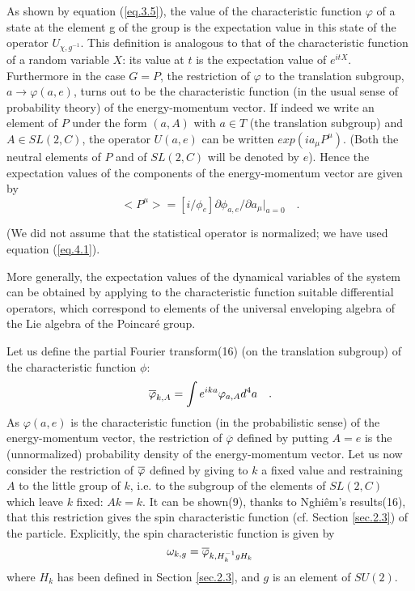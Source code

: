\documentclass[a4paper,11pt]{article}
\def\Uc#1{U_{\chi,{#1}}}
\begin{document}
 As shown by equation (\ref{eq.3.5}), the value of the characteristic function $\varphi$ of a 
state at 
the element g of the group is the expectation value in this state of the operator 
$\Uc{g^{-1}}$. This 
definition is analogous to that of the characteristic function of a random variable $X$: its 
value at $t$ is the expectation value of $e^{itX}$. Furthermore in the case $G=P$, the 
restriction of $\varphi$ 
to the translation subgroup, $a \rightarrow \varphi(a,e)$, turns out to be the characteristic 
function (in the 
usual sense of probability theory) of the energy-momentum vector. If indeed we write an element 
of $P$ under the form $(a,A)$ with $a \in T$ (the translation subgroup) and $A \in  SL(2,C)$, 
the operator 
$U(a,e)$ can be written $exp(ia_{\mu}P^{\mu})$. (Both the neutral elements of $P$ and of 
$SL(2,C)$ will be 
denoted by $e$). Hence the expectation values of the components of the energy-momentum vector 
are given by  
\begin{equation}
 \label{eq.5.1}
    < P^{\mu} > = [i/\phi_e] \partial \phi_{a,e}/\partial a_{\mu} |_{a=0}  \quad .
\end{equation}

(We did not assume that the statistical operator is normalized; we have used equation 
(\ref{eq.4.1}). 

More generally, the expectation values of the dynamical variables of the system can be obtained 
by applying to the characteristic function suitable differential operators, which correspond to 
elements of the universal enveloping algebra of the Lie algebra of the Poincar\'e  group. 

Let us define the partial Fourier transform(16) (on the translation subgroup) of the 
characteristic function $\phi$:
$$
  \overline{\varphi}_{k,A} = \int e^{ika} \varphi_{a,A} d^4a  \quad .
$$
As $\varphi(a,e)$ is the characteristic function (in the probabilistic sense) of the 
energy-momentum 
vector, the restriction of $\overline \varphi$ defined by putting $A=e$ is the (unnormalized) 
probability density of the energy-momentum vector. 
Let us now consider the restriction of $\overline{\varphi}$ defined by giving to $k$ a fixed value and 
restraining $A$ 
to the little group of $k$, i.e. to the subgroup of the elements of $SL(2,C)$ which leave $k$ 
fixed: 
$Ak=k$. It can be shown(9), thanks to Nghi\^em's results(16), that this restriction gives the 
spin 
characteristic function (cf. Section \ref{sec.2.3}) of the particle. Explicitly, the spin 
characteristic function is given by
\begin{equation}
 \label{eq.5.2}
    \omega_{k,g} = \overline{\varphi}_{k,H_k^{-1}gH_k}
\end{equation}
where $H_k$ has been defined in Section \ref{sec.2.3}, and $g$ is an element of $SU(2)$. 
\end{document}

